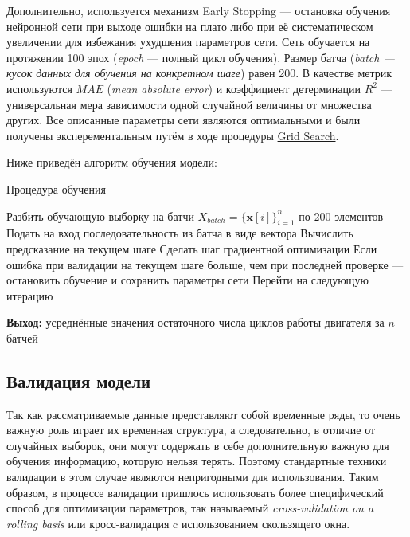 \documentclass[14pt]{extarticle}
\begin{document}
Дополнительно, используется механизм Early Stopping --- остановка обучения нейронной сети при выходе ошибки на плато либо при её систематическом увеличении для избежания ухудшения параметров сети. Сеть обучается на протяжении 100 эпох ({\it epoch} --- полный цикл обучения). Размер батча ({\it batch --- кусок данных для обучения на конкретном шаге}) равен 200. В качестве метрик используются $MAE$ ({\it mean absolute error}) и коэффициент детерминации $R^2$  --- универсальная мера зависимости одной случайной величины от множества других. Все описанные параметры сети являются оптимальными и были получены эксперементальным путём в ходе процедуры \hyperref[glossary]{Grid Search}.

Ниже приведён алгоритм обучения модели:

\begin{algorithm}[H]
	\caption{{Процедура обучения}}
	
	\begin{algorithmic}[1]
		\STATE Разбить обучающую выборку на батчи $X_{batch} = \{\textbf{x}[i]\}_{i = 1}^{n}$ по 200 элементов
		\STATE Подать на вход последовательность из батча в виде вектора
		\STATE Вычислить предсказание на текущем шаге
		\STATE Сделать шаг градиентной оптимизации
		\STATE Если ошибка при валидации на текущем шаге больше, чем при последней проверке --- остановить обучение и сохранить параметры сети
		\STATE Перейти на следующую итерацию
		\ENDFOR
		
		\hspace*{\algorithmicindent} \textbf{Выход:} усреднённые значения остаточного числа циклов работы двигателя за $n$ батчей
	\end{algorithmic}
\end{algorithm}

\subsection{Валидация модели}

Так как рассматриваемые данные представляют собой временные ряды, то очень важную роль играет их временная структура, а следовательно, в отличие от случайных выборок, они могут содержать в себе дополнительную важную для обучения информацию, которую нельзя терять. Поэтому стандартные техники валидации в этом случае являются непригодными для использования. Таким образом, в процессе валидации пришлось использовать более специфический способ для оптимизации параметров, так называемый {\it cross-validation on a rolling basis} или кросс-валидация c использованием скользящего окна. 
\end{document}
